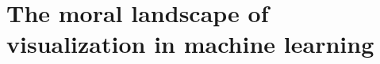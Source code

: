 \section{The moral landscape of visualization in machine learning}\label{ch:ethics_machine_learning_ch}

